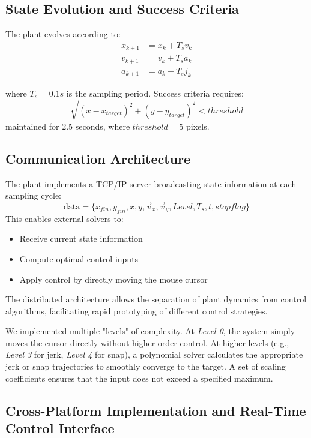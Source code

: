 \documentclass[12pt]{article}
\begin{document}
\subsection{State Evolution and Success Criteria}
The plant evolves according to:
\begin{equation}
\begin{aligned}
x_{k+1} &= x_k + T_s v_k \\
v_{k+1} &= v_k + T_s a_k \\
a_{k+1} &= a_k + T_s j_k
\end{aligned}
\end{equation}

where $T_s = 0.1s$ is the sampling period.
Success criteria requires:
\begin{equation}
\sqrt{(x-x_{target})^2 + (y-y_{target})^2} < threshold
\end{equation}
maintained for 2.5 seconds, where $threshold = 5$ pixels.

\subsection{Communication Architecture}
The plant implements a TCP/IP server broadcasting state information at each sampling cycle:
\begin{equation}
\text{data} = \{x_{fin}, y_{fin}, x, y, \vec{v}_x, \vec{v}_y, Level, T_s, t, stopflag\}
\end{equation}
This enables external solvers to:
\begin{itemize}
\item Receive current state information
\item Compute optimal control inputs
\item Apply control by directly moving the mouse cursor
\end{itemize}

The distributed architecture allows the separation of plant dynamics from control algorithms, facilitating rapid prototyping of different control strategies.

We implemented multiple "levels" of complexity. At \emph{Level 0}, the system simply moves the cursor directly without higher-order control. At higher levels (e.g., \emph{Level 3} for jerk, \emph{Level 4} for snap), a polynomial solver calculates the appropriate jerk or snap trajectories to smoothly converge to the target. A set of scaling coefficients ensures that the input does not exceed a specified maximum.


\subsection{Cross-Platform Implementation and Real-Time Control Interface}
\end{document}
